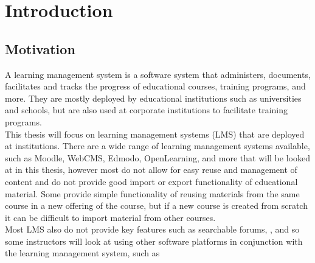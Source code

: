\chapter{Introduction}\label{ch:intro}

\section{Motivation}
A learning management system is a software system that administers, documents, facilitates and tracks the progress of educational courses, training programs, and more. They are mostly deployed by educational institutions such as universities and schools, but are also used at corporate institutions to facilitate training programs.\cite{lmsdefinition}\\

This thesis will focus on learning management systems (LMS) that are deployed at institutions. There are a wide range of learning management systems available, such as Moodle, WebCMS, Edmodo, OpenLearning, and more that will be looked at in this thesis, however most do not allow for easy reuse and management of content and do not provide good import or export functionality of educational material. Some provide simple functionality of reusing materials from the same course in a new offering of the course, but if a new course is created from scratch it can be difficult to import material from other courses.\\

Most LMS also do not provide key features such as searchable forums, , and so some instructors will look at using other software platforms in conjunction with the learning management system, such as 